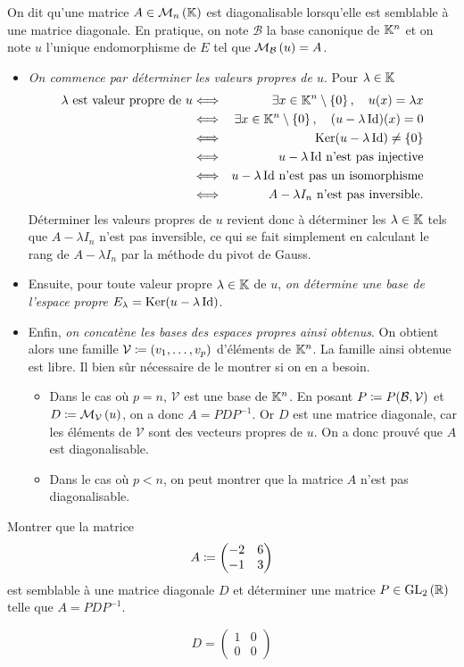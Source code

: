 \documentclass{magnolia}
\begin{document}
On dit qu'une matrice $A\in\mathcal{M}_{n}\left(\mathbb{K}\right)$ est diagonalisable lorsqu'elle est semblable
à une matrice diagonale. En pratique, on note $\mathcal{B}$ la base canonique de $\mathbb{K}^n$ et on
note $u$ l'unique endomorphisme de $E$ tel que $\mathcal{M}_{\mathcal{B}}\left(u\right)=A$.
\begin{itemize}
\item \emph{On commence par déterminer les valeurs propres de $u$}. Pour $\lambda\in\mathbb{K}$
\begin{eqnarray*}
\text{$\lambda$ est valeur propre de $u$}
&\Longleftrightarrow& \exists x\in \mathbb{K}^n \setminus\left\{0\right\} ,\quad u(x)=\lambda x\\
&\Longleftrightarrow& \exists x\in \mathbb{K}^n \setminus\left\{0\right\} ,\quad (u-\lambda \operatorname{Id})(x)=0\\
&\Longleftrightarrow& \mathop{\rm Ker}(u-\lambda \operatorname{Id})\neq\left\{0\right\}\\
&\Longleftrightarrow& \text{$u-\lambda \operatorname{Id}$ n'est pas injective}\\
&\Longleftrightarrow& \text{$u-\lambda \operatorname{Id}$ n'est pas un isomorphisme}\\
&\Longleftrightarrow& \text{$A-\lambda I_n$ n'est pas inversible.}
\end{eqnarray*}
Déterminer les valeurs propres de $u$ revient donc à déterminer les $\lambda\in\mathbb{K}$
tels que $A-\lambda I_n$ n'est pas inversible, ce qui se fait simplement en calculant
le rang de $A-\lambda I_n$ par la méthode du pivot de Gauss.
\item Ensuite, pour toute valeur propre $\lambda\in\mathbb{K}$ de $u$, \emph{on détermine une base
  de l'espace propre $E_\lambda=\mathop{\rm Ker}(u-\lambda \operatorname{Id})$}.
\item Enfin, \emph{on concatène les bases des espaces propres ainsi obtenus}. On obtient
  alors une famille $\mathcal{V}\coloneqq(v_1,\ldots,v_p)$ d'éléments de $\mathbb{K}^n$. La
  famille ainsi obtenue est libre. Il bien sûr nécessaire de le montrer si on en a besoin.
  \begin{itemize}
  \item
  Dans le cas où $p=n$, $\mathcal{V}$ est une base de $\mathbb{K}^n$. En posant
  $P\coloneqq P(\mathcal{B},\mathcal{V})$ et $D\coloneqq \mathcal{M}_{\mathcal{V}}\left(u\right)$, on a
  donc $A=PDP^{-1}$. Or $D$ est une matrice
  diagonale, car les éléments de $\mathcal{V}$ sont des vecteurs propres de $u$.
  On a donc prouvé que $A$ est diagonalisable.
  \item Dans le cas où $p<n$, on peut montrer que la matrice $A$ n'est pas
  diagonalisable.
  \end{itemize}
\end{itemize}

\begin{exoUnique}
\exo Montrer que la matrice
  \[A\coloneqq
    \begin{pmatrix}
    -2 & 6\\
    -1 & 3
    \end{pmatrix}\]
  est semblable à une matrice diagonale $D$ et déterminer une matrice
  $P\in{\rm GL}_{2}\left(\mathbb{R}\right)$ telle que $A=PDP^{-1}$.
  \begin{sol}
  \[D=
    \begin{pmatrix}
    1 & 0\\
    0 & 0
    \end{pmatrix}\]    
  \end{sol}
\end{exoUnique}
\end{document}
